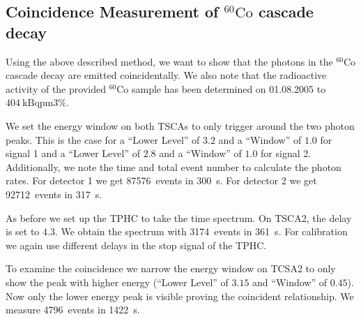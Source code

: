 \subsection*{Coincidence Measurement of $^{60}\text{Co}$ cascade decay}
%
Using the above described method, we want to show that the photons in the $^{60}\text{Co}$ cascade decay are emitted coincidentally.
We also note that the radioactive activity of the provided $^{60}\text{Co}$ sample has been determined on 01.08.2005 to $\SI{404}{\kilo\becquerel \pm 3 \percent}$.
%
\par
%
We set the energy window on both TSCAs to only trigger around the two photon peaks.
This is the case for a \enquote{Lower Level} of $3.2$ and a \enquote{Window} of $1.0$ for signal 1 and a \enquote{Lower Level} of $2.8$ and a \enquote{Window} of $1.0$ for signal 2.
Additionally, we note the time and total event number to calculate the photon rates.
For detector 1 we get \SI{87576}{events} in \SI{300}{\second}.
For detector 2 we get \SI{92712}{events} in \SI{317}{\second}.
%
\par
%
As before we set up the TPHC to take the time spectrum.
On TSCA2, the delay is set to $4.3$.
We obtain the spectrum with \SI{3174}{events} in \SI{361}{\second}.
For calibration we again use different delays in the stop signal of the TPHC.
%
\par
%
To examine the coincidence we narrow the energy window on TCSA2 to only show the peak with higher energy (\enquote{Lower Level} of $3.15$ and \enquote{Window} of $0.45$).
Now only the lower energy peak is visible proving the coincident relationship.
We measure \SI{4796}{events} in \SI{1422}{\second}.
%
